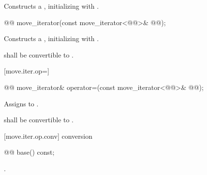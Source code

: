 \begin{itemdescr}
\pnum
\effects Constructs a , initializing
 with .
\end{itemdescr}


%
\begin{itemdecl}
@@
move_iterator(const move_iterator<@@>& @@);
\end{itemdecl}

\begin{itemdescr}
\pnum
\effects Constructs a , initializing
 with .

\begin{removedblock}
\pnum
\requires {} shall be convertible to
.
\end{removedblock}
\end{itemdescr}

[move.iter.op=]{}

%
%
\begin{itemdecl}
@@
move_iterator& operator=(const move_iterator<@@>& @@);
\end{itemdecl}

\begin{itemdescr}
\pnum
\effects Assigns  to
.

\begin{removedblock}
\pnum
\requires {} shall be convertible to
.
\end{removedblock}
\end{itemdescr}

[move.iter.op.conv]{ conversion}

%
%
\begin{itemdecl}
@@ base() const;
\end{itemdecl}

\begin{itemdescr}
\pnum
\returns {}.
\end{itemdescr}

